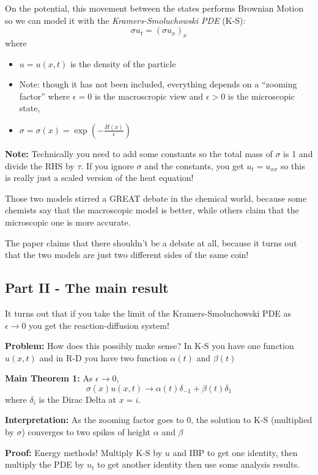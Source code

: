 \documentclass[12pt]{article}
\begin{document}
On the potential, this movement between the states performs Brownian Motion so we can model it with the \emph{Kramers-Smoluchowski PDE} (K-S):
\[\boxed{\sigma u_t = (\sigma u_x)_x}\]
where 
\begin{itemize}
    \item $u = u(x, t)$ is the density of the particle
    \item Note: though it has not been included, everything depends on a ``zooming factor'' where $\epsilon = 0$ is the macroscropic view and $\epsilon > 0$ is the microscopic state, 
    \item $\sigma = \sigma(x) = \exp(-\frac{H(x)}{\epsilon})$
\end{itemize}

\textbf{Note:} Technically you need to add some constants so the total mass of $\sigma$ is 1 and divide the RHS by $\tau$. If you ignore $\sigma$ and the constants, you get $u_t = u_{xx}$ so this is really just a scaled version of the heat equation! 

Those two models stirred a GREAT debate in the chemical world, because some chemists say that the macroscopic model is better, while others claim that the microscopic one is more accurate.

The paper claims that there shouldn't be a debate at all, because it turns out that the two models are just two different sides of the same coin!

\subsection*{Part II - The main result}
It turns out that if you take the limit of the Kramers-Smoluchowski PDE as $\epsilon \to 0$ you get the reaction-diffusion system!

\textbf{Problem:} How does this possibly make sense? In K-S you have one function $u(x, t)$ and in R-D you have two function $\alpha(t)$ and $\beta(t)$

\textbf{Main Theorem 1:} As $\epsilon \to 0$,
\[\boxed{\sigma(x)u(x, t) \to \alpha(t)\delta_{-1} + \beta(t) \delta_1}\]
where $\delta_i$ is the Dirac Delta at $x = i$.

\textbf{Interpretation:} As the zooming factor goes to 0, the solution to K-S (multiplied by $\sigma$) converges to two spikes of height $\alpha$ and $\beta$

\textbf{Proof:} Energy methods! Multiply K-S by $u$ and IBP to get one identity, then multiply the PDE by $u_t$ to get another identity then use some analysis results. 
\end{document}
